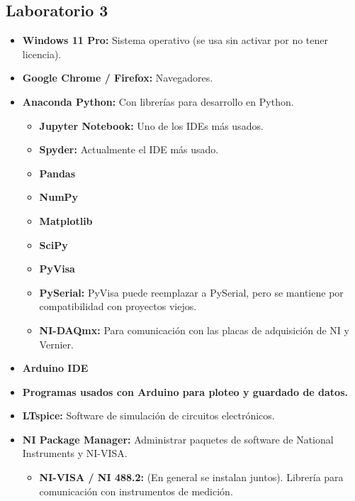 \subsection{Laboratorio 3}
\begin{itemize}
    \item \textbf{Windows 11 Pro:} Sistema operativo (se usa sin activar por no tener licencia).
    \item \textbf{Google Chrome / Firefox:} Navegadores.
    \item \textbf{Anaconda Python:} Con librerías para desarrollo en Python.
    \begin{itemize}
        \item \textbf{Jupyter Notebook:} Uno de los IDEs más usados.
        \item \textbf{Spyder:} Actualmente el IDE más usado.
        \item \textbf{Pandas}
        \item \textbf{NumPy}
        \item \textbf{Matplotlib}
        \item \textbf{SciPy}
        \item \textbf{PyVisa}
        \item \textbf{PySerial:} PyVisa puede reemplazar a PySerial, pero se mantiene por compatibilidad con proyectos viejos.
        \item \textbf{NI-DAQmx:} Para comunicación con las placas de adquisición de NI y Vernier.
    \end{itemize}
    \item \textbf{Arduino IDE}
    \item \textbf{Programas usados con Arduino para ploteo y guardado de datos.}
    \item \textbf{LTspice:} Software de simulación de circuitos electrónicos.
    \item \textbf{NI Package Manager:} Administrar paquetes de software de National Instruments y NI-VISA.
    \begin{itemize}
        \item \textbf{NI-VISA / NI 488.2:} (En general se instalan juntos). Librería para comunicación con instrumentos de medición.

\end{itemize}
\end{itemize}
